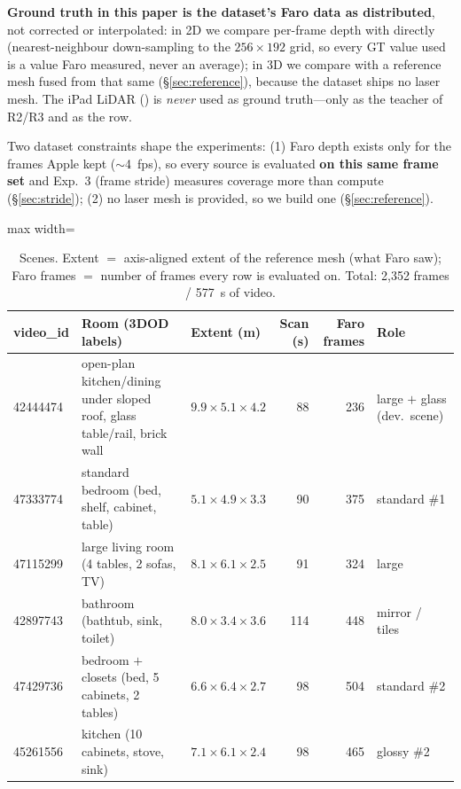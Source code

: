 \textbf{Ground truth in this paper is the dataset's Faro data as distributed}, not corrected or interpolated: in 2D we
compare per-frame depth with  directly (nearest-neighbour down-sampling to the $256\times192$ grid,
so every GT value used is a value Faro measured, never an average); in 3D we compare with a reference mesh fused from
that same  (\S\ref{sec:reference}), because the dataset ships no laser mesh. The iPad LiDAR
() is \emph{never} used as ground truth---only as the teacher of R2/R3 and as the  row.

Two dataset constraints shape the experiments: (1) Faro depth exists only for the frames Apple kept ($\sim$4~fps), so
every source is evaluated \textbf{on this same frame set} and Exp.~3 (frame stride) measures coverage more than
compute (\S\ref{sec:stride}); (2) no laser mesh is provided, so we build one (\S\ref{sec:reference}).

\begin{table}[t]
\centering\small
\caption{Scenes. Extent $=$ axis-aligned extent of the reference mesh (what Faro saw); Faro frames $=$ number of
frames every row is evaluated on. Total: 2{,}352 frames / \SI{577}{s} of video.}
\label{tab:scenes}
\begin{adjustbox}{max width=\textwidth}
\begin{tabular}{@{}lllrrl@{}}
\toprule
video\_id & Room (3DOD labels) & Extent (m) & Scan (s) & Faro frames & Role \\
\midrule
42444474 & open-plan kitchen/dining under sloped roof, glass table/rail, brick wall & $9.9\times5.1\times4.2$ & 88 & 236 & large $+$ glass (dev.\ scene) \\
47333774 & standard bedroom (bed, shelf, cabinet, table) & $5.1\times4.9\times3.3$ & 90 & 375 & standard \#1 \\
47115299 & large living room (4 tables, 2 sofas, TV) & $8.1\times6.1\times2.5$ & 91 & 324 & large \\
42897743 & bathroom (bathtub, sink, toilet) & $8.0\times3.4\times3.6$ & 114 & 448 & mirror / tiles \\
47429736 & bedroom $+$ closets (bed, 5 cabinets, 2 tables) & $6.6\times6.4\times2.7$ & 98 & 504 & standard \#2 \\
45261556 & kitchen (10 cabinets, stove, sink) & $7.1\times6.1\times2.4$ & 98 & 465 & glossy \#2 \\
\bottomrule
\end{tabular}
\end{adjustbox}
\end{table}

